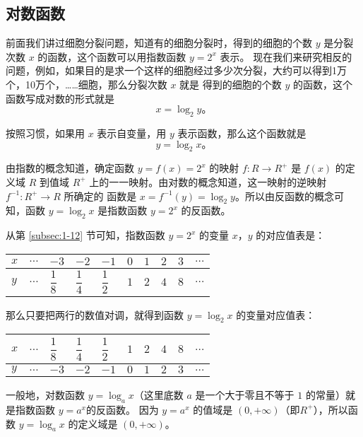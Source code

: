 \subsection{对数函数}\label{subsec:1-13}

前面我们讲过细胞分裂问题，知道有的细胞分裂时，得到的细胞的个数 $y$ 是分裂次数 $x$ 的函数，这个函数可以用指数函数 $y = 2^x$ 表示。
现在我们来研究相反的问题，例如，如果目的是求一个这样的细胞经过多少次分裂，大约可以得到1万个，10万个，……细胞，那么分裂次数 $x$ 就是
得到的细胞的个数 $y$ 的函数，这个函数写成对数的形式就是
$$x = \log_2 y \text{。}$$

按照习惯，如果用 $x$ 表示自变量，用 $y$ 表示函数，那么这个函数就是
$$y = \log_2 x \text{。}$$

由指数的概念知道，确定函数 $y = f(x) = 2^x$ 的映射 $f: R \to R^+$ 是 $f(x)$ 的定义域 $R$
到值域 $R^+$ 上的一一映射。由对数的概念知道，这一映射的逆映射 $f^{-1}: R^+ \to R$ 所确定的
函数是 $x = f^{-1}(y)  = \log_2 y$。所以由反函数的概念可知，函数 $y = \log_2 x$ 是指数函数
$y = 2^x$ 的反函数。

从第 \ref{subsec:1-12} 节可知，指数函数 $y = 2^x$ 的变量 $x$，$y$ 的对应值表是：

\begin{table}[H]
\renewcommand\arraystretch{2}
\begin{tabular}{|w{c}{5em}|*{9}{w{c}{2em}|}}
    \hline
    $x$ & $\dots$ & $-3$ & $-2$ & $-1$ & $0$ & $1$ & $2$ & $3$ & $\dots$ \\
    \hline
    $y$ & $\dots$ & $\dfrac 1 8$ & $\dfrac 1 4$ & $\dfrac 1 2$ & $1$ & $2$ & $4$ & $8$ & $\dots$ \\
    \hline
\end{tabular}
\end{table}

那么只要把两行的数值对调，就得到函数 $y = \log_2 x$ 的变量对应值表：

\begin{table}[H]
\renewcommand\arraystretch{2}
\begin{tabular}{|w{c}{5em}|*{9}{w{c}{2em}|}}
    \hline
    $x$ & $\dots$ & $\dfrac 1 8$ & $\dfrac 1 4$ & $\dfrac 1 2$ & $1$ & $2$ & $4$ & $8$ & $\dots$ \\
    \hline
    $y$ & $\dots$ & $-3$ & $-2$ & $-1$ & $0$ & $1$ & $2$ & $3$ & $\dots$ \\
    \hline
\end{tabular}
\end{table}

一般地，对数函数 $y = \log_a x$（这里底数 $a$ 是一个大于零且不等于 $1$ 的常量）就是指数函数 $y = a^x$的反函数。
因为 $y = a^x$ 的值域是 $(0, +\infty)$（即$R^+$），所以函数 $y = \log_a x$ 的定义域是 $(0, +\infty)$。

